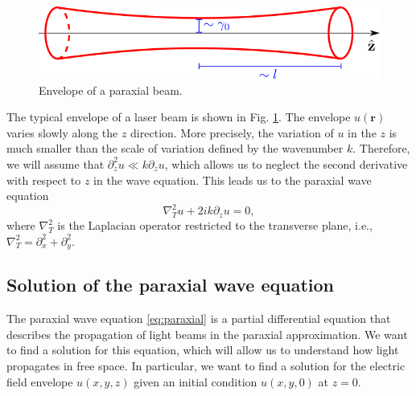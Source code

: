 \documentclass[openany,a4paper,oneside,11pt]{article}
\begin{document}
\begin{figure}[]
    \includegraphics[scale=0.7]{feixe_paraxial.png}
    \centering
    \caption{Envelope of a paraxial beam.}
    \label{fig: paraxial beam}
\end{figure}

The typical envelope of a laser beam is shown in Fig. \ref{fig: paraxial beam}. The envelope $u(\mathbf{r})$ varies slowly along the $z$ direction. More precisely, the variation of $u$ in the $z$ is much smaller than the scale of variation defined by the wavenumber $k$. Therefore, we will assume that $\partial_z^2 u \ll k \partial_z u$, which allows us to neglect the second derivative with respect to $z$ in the wave equation. This leads us to the paraxial wave equation
\begin{equation}
\label{eq:paraxial}
    \nabla^2_T u + 2ik \partial_z u = 0,
\end{equation}
where $\nabla^2_T$ is the Laplacian operator restricted to the transverse plane, i.e., $\nabla^2_T = \partial_x^2 + \partial_y^2$.

\subsection{Solution of the paraxial wave equation}

The paraxial wave equation \eqref{eq:paraxial} is a partial differential equation that describes the propagation of light beams in the paraxial approximation. We want to find a solution for this equation, which will allow us to understand how light propagates in free space. In particular, we want to find a solution for the electric field envelope $u(x,y,z)$ given an initial condition $u(x,y,0)$ at $z=0$.
\end{document}
